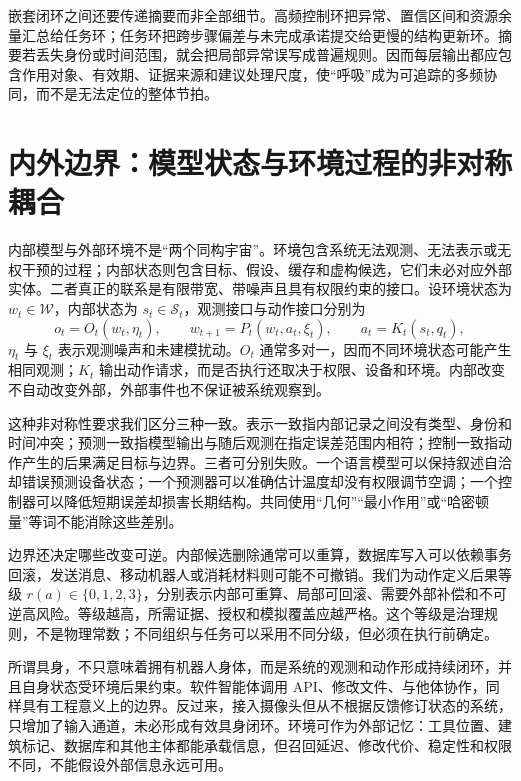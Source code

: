 嵌套闭环之间还要传递摘要而非全部细节。高频控制环把异常、置信区间和资源余量汇总给任务环；任务环把跨步骤偏差与未完成承诺提交给更慢的结构更新环。摘要若丢失身份或时间范围，就会把局部异常误写成普遍规则。因而每层输出都应包含作用对象、有效期、证据来源和建议处理尺度，使“呼吸”成为可追踪的多频协同，而不是无法定位的整体节拍。

\section{内外边界：模型状态与环境过程的非对称耦合}
\label{sec:section_70}

内部模型与外部环境不是“两个同构宇宙”。环境包含系统无法观测、无法表示或无权干预的过程；内部状态则包含目标、假设、缓存和虚构候选，它们未必对应外部实体。二者真正的联系是有限带宽、带噪声且具有权限约束的接口。设环境状态为 $w_t\in\mathcal W$，内部状态为 $s_t\in\mathcal S_t$，观测接口与动作接口分别为
\begin{equation}
  o_t=O_t(w_t,\eta_t),\qquad
  w_{t+1}=P_t(w_t,a_t,\xi_t),\qquad
  a_t=K_t(s_t,q_t),
\end{equation}
$\eta_t$ 与 $\xi_t$ 表示观测噪声和未建模扰动。$O_t$ 通常多对一，因而不同环境状态可能产生相同观测；$K_t$ 输出动作请求，而是否执行还取决于权限、设备和环境。内部改变不自动改变外部，外部事件也不保证被系统观察到。

这种非对称性要求我们区分三种一致。表示一致指内部记录之间没有类型、身份和时间冲突；预测一致指模型输出与随后观测在指定误差范围内相符；控制一致指动作产生的后果满足目标与边界。三者可分别失败。一个语言模型可以保持叙述自洽却错误预测设备状态；一个预测器可以准确估计温度却没有权限调节空调；一个控制器可以降低短期误差却损害长期结构。共同使用“几何”“最小作用”或“哈密顿量”等词不能消除这些差别。

边界还决定哪些改变可逆。内部候选删除通常可以重算，数据库写入可以依赖事务回滚，发送消息、移动机器人或消耗材料则可能不可撤销。我们为动作定义后果等级 $r(a)\in\{0,1,2,3\}$，分别表示内部可重算、局部可回滚、需要外部补偿和不可逆高风险。等级越高，所需证据、授权和模拟覆盖应越严格。这个等级是治理规则，不是物理常数；不同组织与任务可以采用不同分级，但必须在执行前确定。

所谓具身，不只意味着拥有机器人身体，而是系统的观测和动作形成持续闭环，并且自身状态受环境后果约束。软件智能体调用 API、修改文件、与他体协作，同样具有工程意义上的边界。反过来，接入摄像头但从不根据反馈修订状态的系统，只增加了输入通道，未必形成有效具身闭环。环境可作为外部记忆：工具位置、建筑标记、数据库和其他主体都能承载信息，但召回延迟、修改代价、稳定性和权限不同，不能假设外部信息永远可用。

